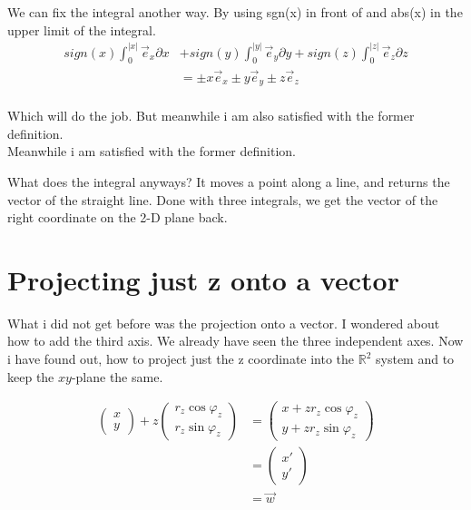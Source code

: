 \documentclass[a4paper]{article}
\begin{document}
We can fix the integral another way. By using sgn(x) in front of and abs(x) in the upper limit of the integral.\\

\begin{displaymath}
\begin{align}
sign(x)\int_{0}^{|x|}\vec{e}_{x}\partial{x} &+
sign(y)\int_{0}^{|y|}\vec{e}_{y}\partial{y} +
sign(z)\int_{0}^{|z|}\vec{e}_{z}\partial{z} \\
&= \pm{x}\vec{e}_{x} \pm{y}\vec{e}_{y} \pm{z}\vec{e}_{z}\\
\end{align}
\end{displaymath}

Which will do the job. But meanwhile i am also satisfied with the former definition.\\Meanwhile i am satisfied with the former definition.


What does the integral anyways? It moves a point along a line, and returns the vector of the straight line. Done with three integrals, we get the vector of the right coordinate on the 2-D plane back.\\

\section{Projecting just z onto a vector}

\label{projecting_just_z}
What i did not get before was the projection onto a vector. I wondered about how to add the third axis. We already have seen the three independent axes. Now i have found out, how to project just the z coordinate into the $\mathbb{R}^{2}$ system and to keep the $xy$-plane the same. 

\begin{displaymath}
\begin{align}
\begin{pmatrix}x\\y\end{pmatrix} + z\begin{pmatrix}r_z\cos\varphi_z\\r_z\sin\varphi_z\end{pmatrix} &= \begin{pmatrix}x+zr_{z}\cos\varphi_z\\y+zr_{z}\sin\varphi_z\end{pmatrix}\\ &= \begin{pmatrix}x'\\y'\end{pmatrix}\\ &= \vec{w}
\end{align}
\end{displaymath}
\end{document}
